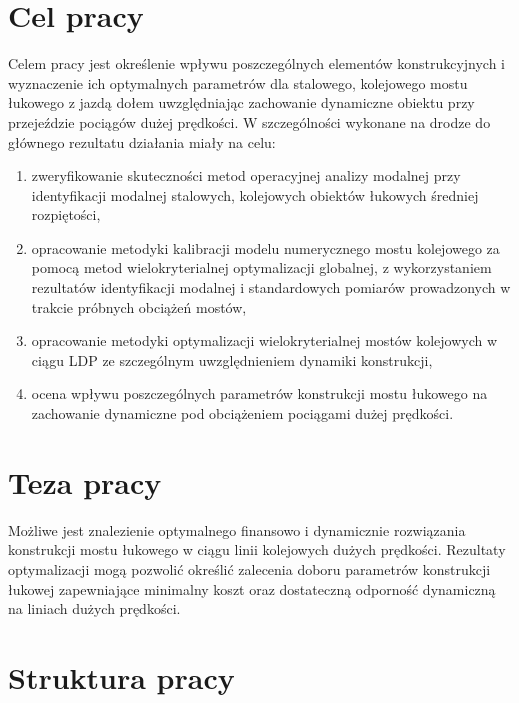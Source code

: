 \section*{Cel pracy}
Celem pracy jest określenie wpływu poszczególnych elementów konstrukcyjnych i wyznaczenie ich optymalnych parametrów dla stalowego, kolejowego mostu łukowego z jazdą dołem uwzględniając zachowanie dynamiczne obiektu przy przejeździe pociągów dużej prędkości.
W szczególności wykonane na drodze do głównego rezultatu działania miały na celu:
\begin{enumerate}
	\item zweryfikowanie skuteczności metod operacyjnej analizy modalnej przy identyfikacji modalnej stalowych, kolejowych obiektów łukowych średniej rozpiętości,
	\item opracowanie metodyki kalibracji modelu numerycznego mostu kolejowego za pomocą metod wielokryterialnej optymalizacji globalnej, z wykorzystaniem rezultatów identyfikacji modalnej i standardowych pomiarów prowadzonych w trakcie próbnych obciążeń mostów,
	\item opracowanie metodyki optymalizacji wielokryterialnej mostów kolejowych w ciągu LDP ze szczególnym uwzględnieniem dynamiki konstrukcji,
	\item ocena wpływu poszczególnych parametrów konstrukcji mostu łukowego na zachowanie dynamiczne pod obciążeniem pociągami dużej prędkości.
\end{enumerate}


\section*{Teza pracy}
Możliwe jest znalezienie optymalnego finansowo i dynamicznie rozwiązania konstrukcji mostu łukowego w ciągu linii kolejowych dużych prędkości. Rezultaty optymalizacji mogą pozwolić określić zalecenia doboru parametrów konstrukcji łukowej zapewniające minimalny koszt oraz dostateczną odporność dynamiczną na liniach dużych prędkości.

\section*{Struktura pracy}
